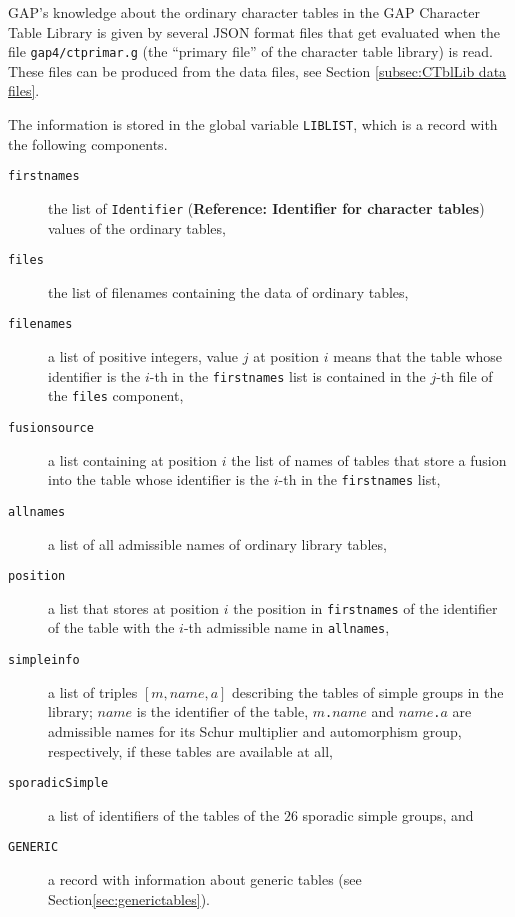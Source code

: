 \documentclass[a4paper,11pt]{report}
\begin{document}
{{{ \textsf{GAP}'s knowledge about the ordinary character tables in the \textsf{GAP} Character Table Library is given by several JSON format files that get
evaluated when the file \texttt{gap4/ctprimar.g} (the ``primary file'' of the character table library) is read. These files can be produced from the
data files, see Section \ref{subsec:CTblLib data files}. 

 The information is stored in the global variable \texttt{LIBLIST}, which is a record with the following components. 

 
\begin{description}
\item[{\texttt{firstnames}}]  the list of \texttt{Identifier} (\textbf{Reference: Identifier for character tables}) values of the ordinary tables, 
\item[{\texttt{files}}]  the list of filenames containing the data of ordinary tables, 
\item[{\texttt{filenames}}]  a list of positive integers, value $j$ at position $i$ means that the table whose identifier is the $i$-th in the \texttt{firstnames} list is contained in the $j$-th file of the \texttt{files} component, 
\item[{\texttt{fusionsource}}]  a list containing at position $i$ the list of names of tables that store a fusion into the table whose
identifier is the $i$-th in the \texttt{firstnames} list, 
\item[{\texttt{allnames}}]  a list of all admissible names of ordinary library tables, 
\item[{\texttt{position}}]  a list that stores at position $i$ the position in \texttt{firstnames} of the identifier of the table with the $i$-th admissible name in \texttt{allnames}, 
\item[{\texttt{simpleinfo}}]  a list of triples $[ m, name, a ]$ describing the tables of simple groups in the library; $name$ is the identifier of the table, $m$\texttt{.}$name$ and $name$\texttt{.}$a$ are admissible names for its Schur multiplier and automorphism group,
respectively, if these tables are available at all, 
\item[{\texttt{sporadicSimple}}]  a list of identifiers of the tables of the $26$ sporadic simple groups, and 
\item[{\texttt{GENERIC}}]  a record with information about generic tables (see Section{\nobreakspace}\ref{sec:generictables}). 
\end{description}
 }

 

}}
\end{document}
